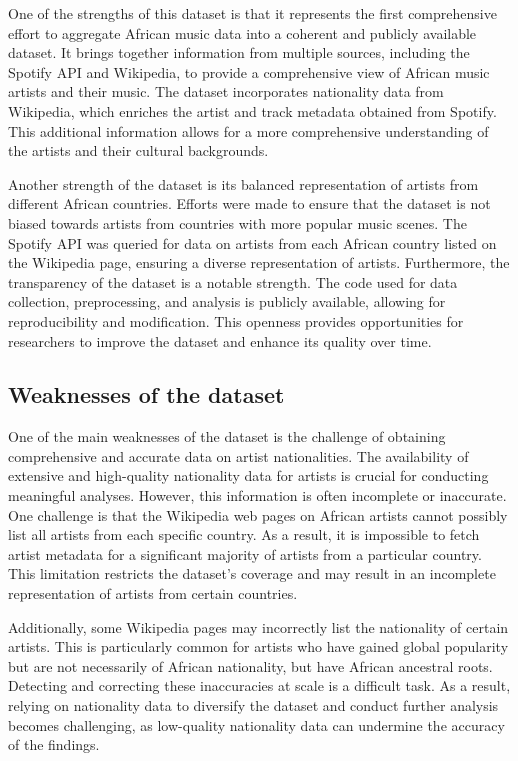 \documentclass{article}
\begin{document}
One of the strengths of this dataset is that it represents the first
comprehensive effort to aggregate African music data into a coherent and
publicly available dataset. It brings together information from multiple
sources, including the Spotify API and Wikipedia, to provide a comprehensive
view of African music artists and their music. The dataset incorporates
nationality data from Wikipedia, which enriches the artist and track metadata
obtained from Spotify. This additional information allows for a more
comprehensive understanding of the artists and their cultural backgrounds.

Another strength of the dataset is its balanced representation of artists from
different African countries. Efforts were made to ensure that the dataset is
not biased towards artists from countries with more popular music scenes. The
Spotify API was queried for data on artists from each African country listed on
the Wikipedia page, ensuring a diverse representation of artists. Furthermore,
the transparency of the dataset is a notable strength. The code used for data
collection, preprocessing, and analysis is publicly available, allowing for
reproducibility and modification. This openness provides opportunities for
researchers to improve the dataset and enhance its quality over time.

\subsection{Weaknesses of the dataset}

One of the main weaknesses of the dataset is the challenge of obtaining
comprehensive and accurate data on artist nationalities. The availability of
extensive and high-quality nationality data for artists is crucial for
conducting meaningful analyses. However, this information is often incomplete
or inaccurate. One challenge is that the Wikipedia web pages on African artists
cannot possibly list all artists from each specific country. As a result, it is
impossible to fetch artist metadata for a significant majority of artists from
a particular country. This limitation restricts the dataset's coverage and may
result in an incomplete representation of artists from certain countries.

Additionally, some Wikipedia pages may incorrectly list the nationality of
certain artists. This is particularly common for artists who have gained global
popularity but are not necessarily of African nationality, but have African
ancestral roots. Detecting and correcting these inaccuracies at scale is a
difficult task. As a result, relying on nationality data to diversify the
dataset and conduct further analysis becomes challenging, as low-quality
nationality data can undermine the accuracy of the findings.
\end{document}
